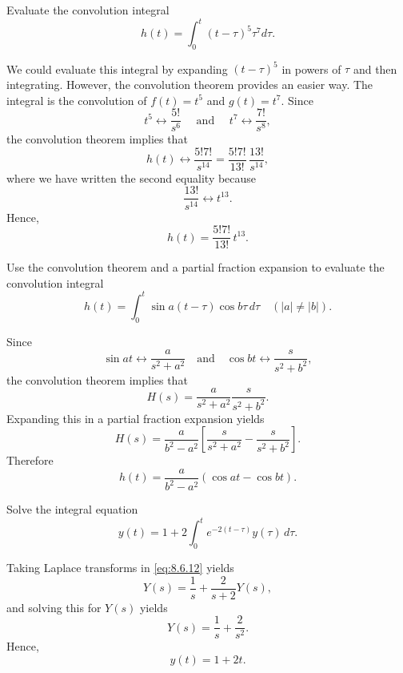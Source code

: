 \setcounter{example}{4}
\begin{example}
  \label{example:8.6.5}\rm Evaluate the convolution integral
  \[
    h(t)=\int_{0}^{t}(t-\tau)^{5}\tau^{7}d\tau.
  \]
\end{example}
\begin{examplesolution}
\solution We could evaluate this integral by expanding $(t-\tau)^{5}$ in powers of $\tau$ and then
integrating. However, the convolution theorem provides an easier way. The integral is the
convolution of $f(t)=t^{5}$ and $g(t)=t^{7}$. Since
\[
  t^{5}\leftrightarrow\frac{5!}{s^{6}}\quad\mbox{ and }\quad t^{7}\leftrightarrow\frac{7!}{s^{8}},
\]
the convolution theorem implies that
\[
  h(t)\leftrightarrow\frac{5!7!}{s^{14}}=\frac{5!7!}{13!}\,\frac{13!}{s^{14}},
\]
where we have written the second equality because
\[
  \frac{13!}{s^{14}}\leftrightarrow t^{13}.
\]
Hence,
\[
  h(t)=\frac{5!7!}{13!}\,t^{13}.
\]
\end{examplesolution}

\setcounter{example}{5}
\begin{example}
  \label{example:8.6.6}\rm Use the convolution theorem and a partial fraction expansion to evaluate
  the convolution integral
  \[
    h(t)=\int_{0}^{t}\sin a(t-\tau)\cos b\tau\,d\tau\quad(|a|\ne|b|).
  \]
\end{example}
\begin{examplesolution}
\solution Since
\[
  \sin at\leftrightarrow\frac{a}{s^{2}+a^{2}}\quad\mbox{and}\quad \cos bt\leftrightarrow\frac{s}{s^{2}+b^{2}},
\]
the convolution theorem implies that
\[
  H(s)=\frac{a}{s^{2}+a^{2}}\frac{s}{s^{2}+b^{2}}.
\]
Expanding this in a partial fraction expansion yields
\[
  H(s)=\frac{a}{b^{2}-a^{2}}\left[\frac{s}{s^{2}+a^{2}}-\frac{s}{s^{2}+b^{2}}\right].
\]
Therefore
\[
  h(t)=\frac{a}{b^{2}-a^{2}}\left(\cos at-\cos bt\right).
\]
\end{examplesolution}

\setcounter{example}{6}
\setcounter{equation}{11}
\begin{example}
  \label{example:8.6.7}\rm Solve the integral equation
  \begin{equation}
    \label{eq:8.6.12}y(t)=1+2\int_{0}^{t}e^{-2(t-\tau)}y(\tau)\,d\tau.
  \end{equation}
\end{example}
\begin{examplesolution}
\solution Taking Laplace transforms in \eqref{eq:8.6.12} yields
\[
  Y(s)=\frac{1}{s}+\frac{2}{s+2}Y(s),
\]
and solving this for $Y(s)$ yields
\[
  Y(s)=\frac{1}{s}+\frac{2}{s^{2}}.
\]
Hence,
\[
  y(t)=1+2t.
\]
\end{examplesolution}

